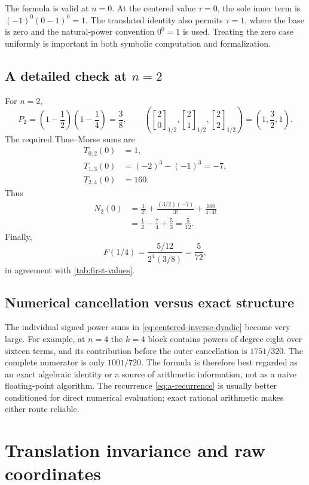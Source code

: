 \documentclass[11pt]{article}
\theoremstyle{definition}
\newcommand{\Fabius}{F}
\newcommand{\Qbin}[3]{\genfrac{[}{]}{0pt}{}{#1}{#2}_{#3}}
\begin{document}
The formula is valid at $n=0$.  At the centered value $\tau=0$, the sole inner term is
$(-1)^0(0-1)^0=1$.  The translated identity also permits $\tau=1$, where the base is zero and the natural-power convention $0^0=1$ is used.  Treating the zero case uniformly is important in both symbolic computation and formalization.

\subsection{A detailed check at \texorpdfstring{$n=2$}{n=2}}

For $n=2$,
\[
  P_2=\left(1-\frac12\right)\left(1-\frac14\right)=\frac38,
  \qquad
  \left(\Qbin{2}{0}{1/2},\Qbin{2}{1}{1/2},\Qbin{2}{2}{1/2}\right)
  =\left(1,\frac32,1\right).
\]
The required Thue--Morse sums are
\begin{align*}
  T_{0,2}(0)&=1,\\
  T_{1,3}(0)&=(-2)^3-(-1)^3=-7,\\
  T_{2,4}(0)&=160.
\end{align*}
Thus
\begin{align*}
  N_2(0)
  &=\frac{1}{2!}
   +\frac{(3/2)(-7)}{3!}
   +\frac{160}{4\cdot4!}\\
  &=\frac12-\frac74+\frac53
   =\frac5{12}.
\end{align*}
Finally,
\[
  \Fabius(1/4)
  =\frac{5/12}{2^4(3/8)}
  =\frac5{72},
\]
in agreement with \cref{tab:first-values}.

\subsection{Numerical cancellation versus exact structure}

The individual signed power sums in \cref{eq:centered-inverse-dyadic} become very large.  For example, at $n=4$ the $k=4$ block contains powers of degree eight over sixteen terms, and its contribution before the outer cancellation is $1751/320$.  The complete numerator is only $1001/720$.  The formula is therefore best regarded as an exact algebraic identity or a source of arithmetic information, not as a naive floating-point algorithm.  The recurrence \cref{eq:a-recurrence} is usually better conditioned for direct numerical evaluation; exact rational arithmetic makes either route reliable.

\section{Translation invariance and raw coordinates}
\label{sec:translation}
\end{document}
